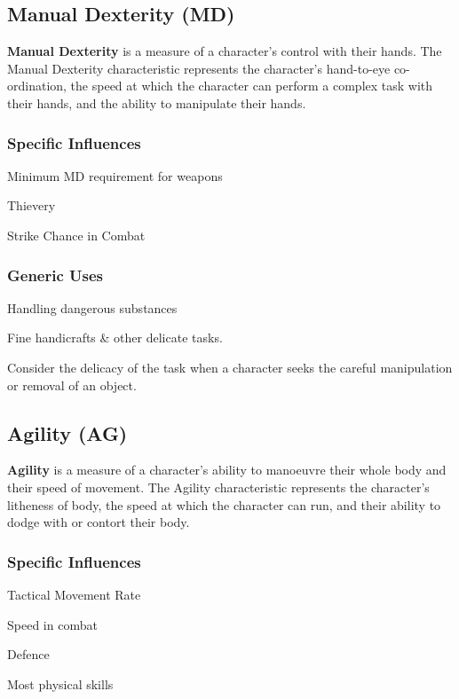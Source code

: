 \begin{multicols*}{3}
\subsection{Manual Dexterity (MD)}

\textbf{Manual Dexterity} is a measure of a character's control with
their hands.  The Manual Dexterity characteristic represents the
character's hand-to-eye co-ordination, the speed at which the
character can perform a complex task with their hands, and the ability
to manipulate their hands.

\subsubsection{Specific Influences}
\begin{Itemize}
\item Minimum MD requirement for weapons
\item Thievery
\item Strike Chance in Combat
\end{Itemize}
\subsubsection{Generic Uses}
\begin{Itemize}
\item Handling dangerous substances
\item Fine handicrafts \& other delicate tasks.
\end{Itemize}
\begin{example}
Consider the delicacy of the task when a character seeks the careful
manipulation or removal of an object.
\end{example}

\subsection{Agility (AG)}

\textbf{Agility} is a measure of a character's ability to manoeuvre
their whole body and their speed of movement.  The Agility
characteristic represents the character's litheness of body, the speed
at which the character can run, and their ability to dodge with or
contort their body.
\subsubsection{Specific Influences}
\begin{Itemize}
\item Tactical Movement Rate
\item Speed in combat
\item Defence
\item Most physical skills
\end{Itemize}

\end{multicols*}
